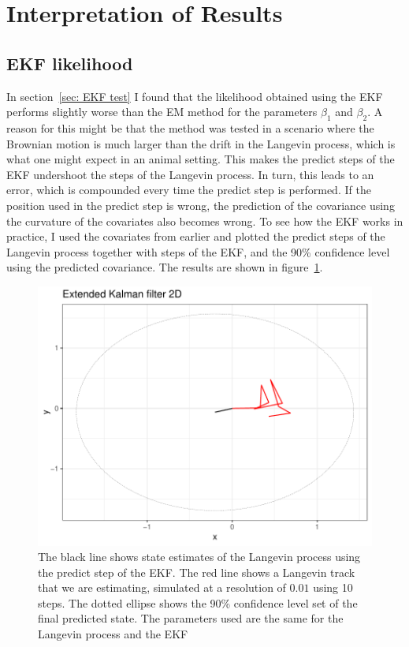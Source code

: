 

\section{Interpretation of Results}
\subsection{EKF likelihood}
 In section~\ref{sec: EKF test} I found that the likelihood obtained using the EKF performs slightly worse than the EM method for the parameters $\beta_1$ and $\beta_2$. A reason for this might be that the method was tested in a scenario where the Brownian motion is much larger than the drift in the Langevin process, which is what one might expect in an animal setting. This makes the predict steps of the EKF undershoot the steps of the Langevin process. In turn, this leads to an error, which is compounded every time the predict step is performed. If the position used in the predict step is wrong, the prediction of the covariance using the curvature of the covariates also becomes wrong. To see how the EKF works in practice, I used the covariates from earlier and plotted the predict steps of the Langevin process together with steps of the EKF, and the 90\% confidence level using the predicted covariance. The results are shown in figure~\ref{fig:EKF high diffusion}. 


\begin{figure}[H]
    \centering
    \includegraphics[width=\linewidth]{Images/discussion/EKF high diffusion path.pdf}
    \caption[EKF path]{The black line shows state estimates of the Langevin process using the predict step of the EKF. The red line shows a Langevin track that we are estimating, simulated at a resolution of $0.01$ using 10 steps. The dotted ellipse shows the 90\% confidence level set of the final predicted state. The parameters used are the same for the Langevin process and the EKF}
    \label{fig:EKF high diffusion}
\end{figure}

